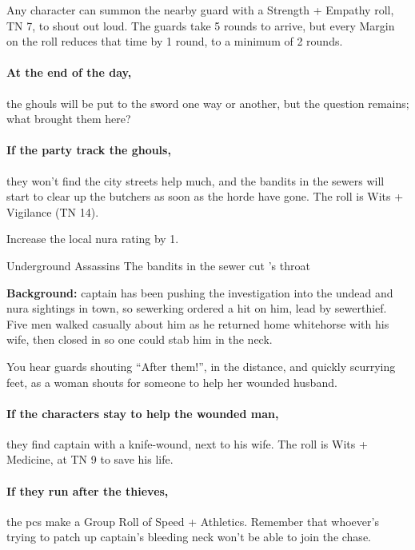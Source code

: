 Any character can summon the nearby guard with a Strength + Empathy roll, TN 7, to shout out loud.
The guards take 5 rounds to arrive, but every Margin on the roll reduces that time by 1 round, to a minimum of 2 rounds.


\paragraph{At the end of the day,}
the ghouls will be put to the sword one way or another, but the question remains; what brought them here?

\paragraph{If the party track the ghouls,}
they won't find the city streets help much, and the bandits in the sewers will start to clear up the butchers as soon as the horde have gone.
The roll is Wits + Vigilance (TN 14).

Increase the local nura rating by 1.

{\N Underground Assassins}%
{The bandits in the sewer cut 's throat}%

\textbf{Background:}
\Gls{captain} has been pushing the investigation into the undead and nura sightings in town, so \gls{sewerking} ordered a hit on him, lead by \gls{sewerthief}.
Five men walked casually about him as he returned home \gls{whitehorse} with his wife, then closed in so one could stab him in the neck.

\begin{boxtext}

  You hear guards shouting ``After them!'', in the distance, and quickly scurrying feet, as a woman shouts for someone to help her wounded husband.

\end{boxtext}

\paragraph{If the characters stay to help the wounded man,}
they find \gls{captain} with a knife-wound, next to his wife.
The roll is Wits + Medicine, at TN 9 to save his life.

\paragraph{If they run after the thieves,}
the \glspl{pc} make a Group Roll of Speed + Athletics.%
\iftoggle{core}%
  {\footnote{See the core rules, page \pageref{grouproll}, for Group Rolls.}}%
{}%
Remember that whoever's trying to patch up \gls{captain}'s bleeding neck won't be able to join the chase.

